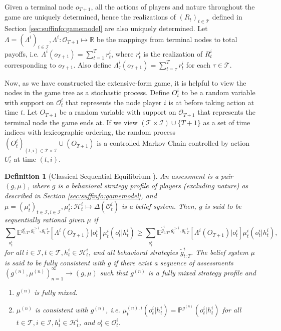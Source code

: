 \documentclass[pdflatex,sn-basic]{sn-jnl}
\newcommand{\E}{\mathbb{E}}
\renewcommand{\Pr}{\mathbb{P}}
\theoremstyle{thmstyleone}%
\theoremstyle{thmstyletwo}%
\theoremstyle{thmstylethree}%
\newtheorem{defn}{Definition}
\begin{document}
\begin{appendices}
Given a terminal node $o_{T+1}$, all the actions of players and nature throughout the game are uniquely determined, hence the realizations of $(R_t)_{t\in\mathcal{T}}$ defined in Section \ref{sec:suffinfo:gamemodel} are also uniquely determined. Let $\Lambda=(\Lambda^i)_{i\in\mathcal{I}}, \Lambda^i\colon\mathcal{O}_{T+1} \mapsto \mathbb{R}$ be the mappings from terminal nodes to total payoffs, i.e. $\Lambda^i(o_{T+1}) = \sum_{t=1}^T r_t^i$, where $r_t^i$ is the realization of $R_t^i$ corresponding to $o_{T+1}$. Also define $\Lambda_{\tau}^i(o_{T+1}) = \sum_{t=\tau}^T r_t^i$ for each $\tau\in\mathcal{T}$.

{Now, as we have constructed the extensive-form game, it is helpful to view the nodes in the game tree as a stochastic process.}
Define $O_t^i$ to be a random variable with support on $\mathcal{O}_t^i$ that represents the node player $i$ is at before taking action at time $t$. Let $O_{T+1}$ be a random variable with support on $\mathcal{O}_{T+1}$ that represents the terminal node the game ends at. 
If we view $(\mathcal{T}\times \mathcal{I}) \cup \{T+1 \}$ as a set of time indices with lexicographic ordering, the random process $(O_t^i)_{(t, i)\in\mathcal{T}\times \mathcal{I}}\cup(O_{T+1})$ is a controlled Markov Chain controlled by action $U_t^i$ at time $(t, i)$. 

\begin{defn}[Classical Sequential Equilibrium \citep{kreps1982sequential}]\label{def:classicalSE}
	An assessment is a pair $(g, \mu)$, where $g$ is a behavioral strategy profile of players (excluding nature) as described in Section \ref{sec:suffinfo:gamemodel}, and $\mu=(\mu_t^i)_{t\in\mathcal{I}, i\in\mathcal{I}}, \mu_t^i\colon\mathcal{H}_t^i \mapsto \Delta(\mathcal{O}_t^i)$ is a belief system. Then, $g$ is said to be sequentially rational given $\mu$ if
	\begin{equation}\label{eq:seqrat}
		\sum_{o_t^i}\E^{g_{t:T}^i, g_t^{>i}, g_{t:T}^{-i}} [\Lambda^i(O_{T+1})|o_t^i]\mu_t^i(o_t^i|h_t^i) \geq \sum_{o_t^i}\E^{\tilde{g}_{t:T}^i, g_t^{>i}, g_{t:T}^{-i}} [\Lambda^i(O_{T+1})|o_t^i]\mu_t^i(o_t^i|h_t^i),
	\end{equation}
	for all $i\in\mathcal{I}, t\in\mathcal{T}, h_t^i\in\mathcal{H}_t^i$, and all behavioral strategies $\tilde{g}_{t:T}^i$. 
   The belief system $\mu$ is said to be fully consistent with $g$ if there exist a sequence of assessments $(g^{(n)}, \mu^{(n)})_{n=1}^\infty \rightarrow (g, \mu)$ such that $g^{(n)}$ is a fully mixed strategy profile and
	\begin{enumerate}[(1)]
		\item $g^{(n)}$ is fully mixed.
		\item $\mu^{(n)}$ is consistent with $g^{(n)}$, i.e. $\mu_t^{(n), i} (o_t^i|h_t^i) = \Pr^{g^{(n)}}(o_t^i|h_t^i)$ for all $t\in\mathcal{T}, i\in\mathcal{I} ,h_t^i\in\mathcal{H}_t^i$, and $o_t^i\in\mathcal{O}_t^i$.
		

\end{enumerate}
\end{defn}
\end{appendices}
\end{document}
